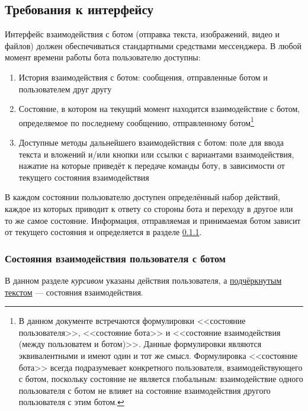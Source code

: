 \subsection{Требования к интерфейсу}
    \label{sec:req:ui}
    Интерфейс взаимодействия с ботом (отправка текста, изображений, видео и файлов)
    должен обеспечиваться стандартными средствами мессенджера. В любой момент времени работы
    бота пользователю доступны:
    \begin{enumerate}
        \item
            История взаимодействия с ботом: сообщения, отправленные ботом и пользователем
            друг другу
        \item
            Состояние, в котором на текущий момент находится взаимодействие с ботом, определяемое
            по последнему сообщению, отправленному ботом\footnote{В данном документе встречаются формулировки
            <<состояние пользователя>>, <<состояние бота>> и <<состояние взаимодействия
            (между пользоватем и ботом)>>. Данные формулировки являются эквивалентными и имеют
            один и тот же смысл. Формулировка <<состояние бота>> всегда подразумевает конкретного пользователя,
            взаимодействующего с ботом, поскольку состояние не является глобальным: взаимодействие одного
            пользователя с ботом не влияет на состояние взаимодействия другого пользователя с этим ботом.}
        \item
            Доступные методы дальнейшего взаимодействия с ботом: поле для ввода текста и вложений
            и/или кнопки или ссылки с вариантами взаимодействия, нажатие на которые приведёт к передаче
            команды боту, в зависимости от текущего состояния взаимодействия
    \end{enumerate}
    В каждом состоянии пользователю доступен определённый набор действий, каждое из которых
    приводит к ответу со стороны бота и переходу в другое или то же самое состояние.
    Информация, отправляемая и принимаемая ботом зависит от текущего состояния и определяется в разделе
    \ref{sec:req:ui:states}.

    \subsubsection{Состояния взаимодействия пользователя с ботом}
        \label{sec:req:ui:states}
        \begingroup
        \newcommand{\action}[1]{\textit{#1}}%
        \newcommand{\state}[1]{\uline{#1}}%
        В данном разделе \action{курсивом} указаны действия пользователя, а \state{подчёркнутым текстом}
        --- состояния взаимодействия.

